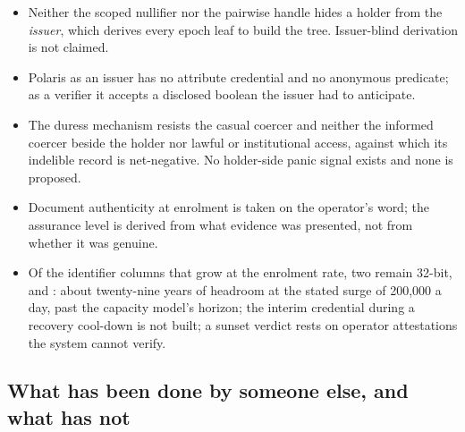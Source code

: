 \begin{itemize}
    issuer-signed values that are the same everywhere. The per-relying-party handle bounds what a
    verifier \emph{stores}; only the zero-knowledge path bounds what it is \emph{shown}, and that
    bound is the size of the epoch, which nothing floors above one and no verdict reports.
  \item Neither the scoped nullifier nor the pairwise handle hides a holder from the \emph{issuer},
    which derives every epoch leaf to build the tree. Issuer-blind derivation is not claimed.
  \item Polaris as an issuer has no attribute credential and no anonymous predicate; as a verifier
    it accepts a disclosed boolean the issuer had to anticipate.
  \item The duress mechanism resists the casual coercer and neither the informed coercer beside the
    holder nor lawful or institutional access, against which its indelible record is net-negative.
    No holder-side panic signal exists and none is proposed.
  \item Document authenticity at enrolment is taken on the operator's word; the assurance level is
    derived from what evidence was presented, not from whether it was genuine.
  \item Of the identifier columns that grow at the enrolment rate, two remain 32-bit,
     and : about twenty-nine years of
    headroom at the stated surge of 200,000 a day, past the capacity model's horizon; the interim credential during a recovery cool-down is not built; a sunset verdict
    rests on operator attestations the system cannot verify.
\end{itemize}

\subsection{What has been done by someone else, and what has not}

